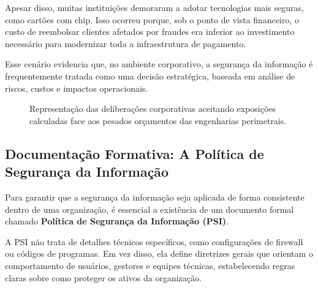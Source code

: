 \documentclass[12pt,a4paper,twoside]{report}
\begin{document}
Apesar disso, muitas instituições demoraram a adotar tecnologias mais seguras, como cartões com chip. Isso ocorreu porque, sob o ponto de vista financeiro, o custo de reembolsar clientes afetados por fraudes era inferior ao investimento necessário para modernizar toda a infraestrutura de pagamento.

Esse cenário evidencia que, no ambiente corporativo, a segurança da informação é frequentemente tratada como uma decisão estratégica, baseada em análise de riscos, custos e impactos operacionais.
\begin{figure}[h]
    \centering
    \caption{Representação das deliberações corporativas aceitando exposições calculadas face aos pesados orçamentos das engenharias perimetrais.}
    \label{fig:decisao_negocios}
\end{figure}

\subsection{Documentação Formativa: A Política de Segurança da Informação}

Para garantir que a segurança da informação seja aplicada de forma consistente dentro de uma organização, é essencial a existência de um documento formal chamado \textbf{Política de Segurança da Informação (PSI)}.

A PSI não trata de detalhes técnicos específicos, como configurações de firewall ou códigos de programas. Em vez disso, ela define diretrizes gerais que orientam o comportamento de usuários, gestores e equipes técnicas, estabelecendo regras claras sobre como proteger os ativos da organização.
\end{document}

